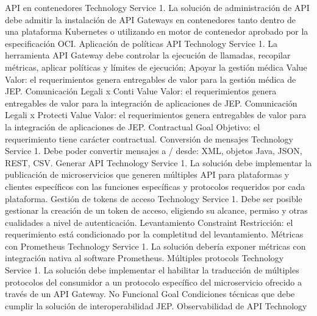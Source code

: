 \documentclass[
  paper=a4,
  ,captions=tableheading
]{scrartcl}
\begin{document}
\textbar{} \textbar{} API en contenedores \textbar{} Technology Service
\textbar{} 1. La solución de administración de API debe admitir la
instalación de API Gateways en contenedores tanto dentro de una
plataforma Kubernetes o utilizando en motor de contenedor aprobado por
la especificación OCI. \textbar{} \textbar{} Aplicación de políticas API
\textbar{} Technology Service \textbar{} 1. La herramienta API Gateway
debe controlar la ejecución de llamadas, recopilar métricas, aplicar
políticas y límites de ejecución; \textbar{} \textbar{} Apoyar la
gestión médica \textbar{} Value \textbar{} Valor: el requerimientos
genera entregables de valor para la gestión médica de JEP. \textbar{}
\textbar{} Comunicación Legali x Conti \textbar{} Value \textbar{}
Valor: el requerimientos genera entregables de valor para la integración
de aplicaciones de JEP. \textbar{} \textbar{} Comunicación Legali x
Protecti \textbar{} Value \textbar{} Valor: el requerimientos genera
entregables de valor para la integración de aplicaciones de JEP.
\textbar{} \textbar{} Contractual \textbar{} Goal \textbar{} Objetivo:
el requerimiento tiene carácter contractual. \textbar{} \textbar{}
Conversión de mensajes \textbar{} Technology Service \textbar{} 1. Debe
poder convertir mensajes a / desde: XML, objetos Java, JSON, REST, CSV.
\textbar{} \textbar{} Generar API \textbar{} Technology Service
\textbar{} 1. La solución debe implementar la publicación de
microservicios que generen múltiples API para plataformas y clientes
específicos con las funciones específicas y protocolos requeridos por
cada plataforma. \textbar{} \textbar{} Gestión de tokens de acceso
\textbar{} Technology Service \textbar{} 1. Debe ser posible gestionar
la creación de un token de acceso, eligiendo su alcance, permiso y otras
cualidades a nivel de autenticación. \textbar{} \textbar{} Levantamiento
\textbar{} Constraint \textbar{} Restricción: el requerimiento está
condicionado por la completitud del levantamiento. \textbar{} \textbar{}
Métricas con Prometheus \textbar{} Technology Service \textbar{} 1. La
solución debería exponer métricas con integración nativa al software
Prometheus. \textbar{} \textbar{} Múltiples protocols \textbar{}
Technology Service \textbar{} 1. La solución debe implementar el
habilitar la traducción de múltiples protocolos del consumidor a un
protocolo específico del microservicio ofrecido a través de un API
Gateway. \textbar{} \textbar{} No Funcional \textbar{} Goal \textbar{}
Condiciones técnicas que debe cumplir la solución de interoperabilidad
JEP. \textbar{} \textbar{} Observabilidad de API \textbar{} Technology
\end{document}
